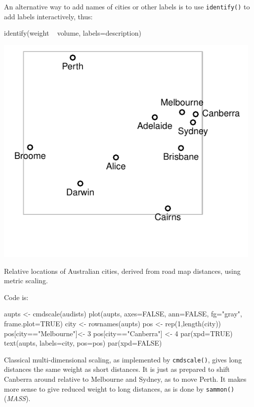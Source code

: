 \documentclass{tufte-book}\usepackage[]{graphicx}\usepackage[]{color}
\newcommand{\txtt}[1]{\texttt{#1}}
\begin{document}
\noindent
An alternative way to add names of cities or other labels is to use
\txtt{identify()} to add labels interactively, thus:
\begin{Schunk}
\begin{Sinput}
identify(weight ~ volume, labels=description)
\end{Sinput}
\end{Schunk}

\begin{marginfigure}
\begin{Schunk}


\centerline{\includegraphics[width=0.98\textwidth]{figs/9-aupoints-1} }

\end{Schunk}
\caption{Relative locations of Australian cities, derived from road
  map distances, using metric scaling.\label{fig:audists}}
\end{marginfigure}
Code is:
\begin{Schunk}
\begin{Sinput}
aupts <- cmdscale(audists)
plot(aupts, axes=FALSE, ann=FALSE, fg="gray",
     frame.plot=TRUE)
city <- rownames(aupts)
pos <- rep(1,length(city))
pos[city=="Melbourne"]<- 3
pos[city=="Canberra"] <- 4
par(xpd=TRUE)
text(aupts, labels=city, pos=pos)
par(xpd=FALSE)
\end{Sinput}
\end{Schunk}


Classical multi-dimensional scaling, as implemented by
 \txtt{cmdscale()}, gives long distances the same weight as short
 distances.  It is just as prepared to shift Canberra around relative
 to Melbourne and Sydney, as to move Perth.  It makes more sense to
 give reduced weight to long distances, as is done by \txtt{sammon()}
 (\textit{MASS}).
\end{document}
